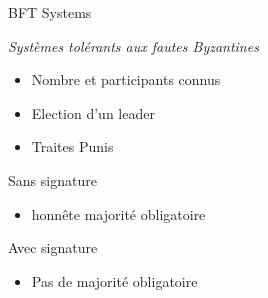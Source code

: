 \documentclass[presentation]{beamer}
\begin{document}
\begin{frame}[label={sec:org9294e01}]{BFT Systems}
\begin{block}{\emph{Systèmes tolérants aux fautes Byzantines}}
\begin{itemize}
\item Nombre et participants connus
\item Election d'un leader
\item Traites Punis
\end{itemize}

\begin{block}{Sans signature}
\begin{itemize}
\item honnête majorité obligatoire
\end{itemize}
\end{block}
\begin{block}{Avec signature}
\begin{itemize}
\item Pas de majorité obligatoire
\end{itemize}
\end{block}
\end{block}
\end{frame}
\end{document}
